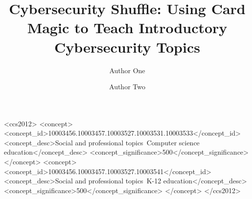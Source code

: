 \documentclass[sigconf]{acmart}
\begin{document}
\title{Cybersecurity Shuffle: Using Card Magic to Teach Introductory Cybersecurity Topics}


\author{
  Author One
}

\author{
  Author Two
}




\begin{CCSXML}
<ccs2012>
<concept>
<concept_id>10003456.10003457.10003527.10003531.10003533</concept_id>
<concept_desc>Social and professional topics~Computer science education</concept_desc>
<concept_significance>500</concept_significance>
</concept>
<concept>
<concept_id>10003456.10003457.10003527.10003541</concept_id>
<concept_desc>Social and professional topics~K-12 education</concept_desc>
<concept_significance>500</concept_significance>
</concept>
</ccs2012>
\end{CCSXML}



\maketitle




%

%
%







\end{document}
